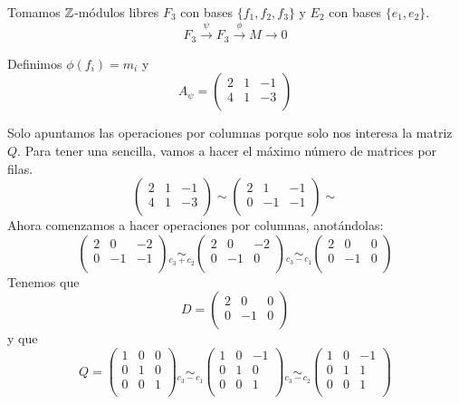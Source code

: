 Tomamos \(\mathbb{Z}\)-módulos libres \(F_3\) con bases \(\{f_1,f_2,f_3\}\) y
\(E_2\) con bases \(\{e_1,e_2\}\).
\[
  F_3\overset{\psi}{\longrightarrow}
  F_3\overset{\phi}{\longrightarrow}
  M\longrightarrow 0
\]

Definimos \(\phi(f_i)=m_i\) y
\[
  A_\psi =
  \begin{pmatrix}
    2&1&-1\\
    4&1&-3\\
  \end{pmatrix}
\]

Solo apuntamos las operaciones por columnas porque solo nos interesa la
matriz \(Q\). Para tener una sencilla, vamos a hacer el máximo número
de matrices por filas.
\[
  \begin{pmatrix}
    2&1&-1\\
    4&1&-3\\
  \end{pmatrix}\sim
  \begin{pmatrix}
    2&1&-1\\
    0&-1&-1\\
  \end{pmatrix}\sim
\]
Ahora comenzamos a hacer operaciones por columnas, anotándolas:
\[
  \begin{pmatrix}
    2&0&-2\\
    0&-1&-1\\
  \end{pmatrix}\underset{c_3+c_2}{\sim}
  \begin{pmatrix}
    2&0&-2\\
    0&-1&0\\
  \end{pmatrix}\underset{c_3-c_1}{\sim}
  \begin{pmatrix}
    2&0&0\\
    0&-1&0\\
  \end{pmatrix}
\]
Tenemos que
\[
  D=
  \begin{pmatrix}
    2&0&0\\
    0&-1&0\\
  \end{pmatrix}
\]
y que
\[
  Q=
  \begin{pmatrix}
    1&0&0\\
    0&1&0\\
    0&0&1\\
  \end{pmatrix}\underset{c_3-c_1}{\sim}
  \begin{pmatrix}
    1&0&-1\\
    0&1&0\\
    0&0&1\\
  \end{pmatrix}\underset{c_3-c_2}{\sim}
  \begin{pmatrix}
    1&0&-1\\
    0&1&1\\
    0&0&1\\
  \end{pmatrix}
\]

